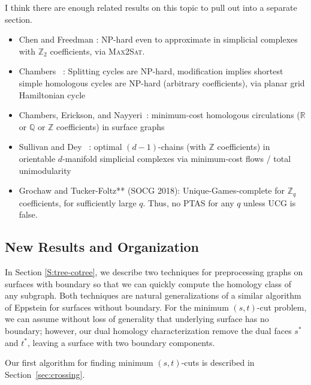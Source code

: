 \documentclass[11pt,twoside]{article}
\def\Z{\mathbb{Z}}
\def\Real{\mathbb{R}}
\def\Q{\mathbb{Q}}
\begin{document}
\begin{TODO}
\noindent I think there are enough related results on this topic to pull out into a separate section.
\begin{itemize}\cramped
\item
Chen and Freedman \cite{cf-qhc-08, cf-qhc2-07}: NP-hard even to approximate in simplicial complexes with $\Z_2$ coefficients, via \textsc{Max2Sat}.
\item
Chambers \etal~\cite{ccelw-scsih-08}: Splitting cycles are NP-hard, modification implies shortest simple homologous cycles are NP-hard (arbitrary coefficients), via planar grid Hamiltonian cycle
\item
Chambers, Erickson, and Nayyeri~\cite{cen-hfcc-12}: minimum-cost homologous circulations ($\Real$ or $\Q$ or $\Z$ coefficients) in surface graphs
\item
Sullivan \cite{s-cath-90} and Dey \etal\ \cite{dhk-ohctu-11}: optimal $(d-1)$-chains (with $\Z$ coefficients) in orientable $d$-manifold simplicial complexes via minimum-cost flows / total unimodularity
\item
Grochaw and Tucker-Foltz** (SOCG 2018): Unique-Games-complete for $\Z_q$ coefficients, for sufficiently large $q$.  Thus, no PTAS for any $q$ unless UCG is false.
\end{itemize}
\end{TODO}

\subsection{New Results and Organization}

 \color{PineGreen}

In Section \ref{S:tree-cotree}, we describe two techniques for preprocessing graphs on surfaces with boundary so that we can quickly compute the homology class of any subgraph.  Both techniques are natural generalizations of a similar algorithm of Eppstein \cite{e-dgteg-03} for surfaces without boundary.  For the minimum $(s,t)$-cut problem, we can assume without loss of generality that underlying surface has no boundary; however, our dual homology characterization remove the dual faces $s^*$ and $t^*$, leaving a surface with two boundary components.

Our first algorithm for finding minimum $(s,t)$-cuts is described in Section~\ref{sec:crossing}.  
\end{document}
